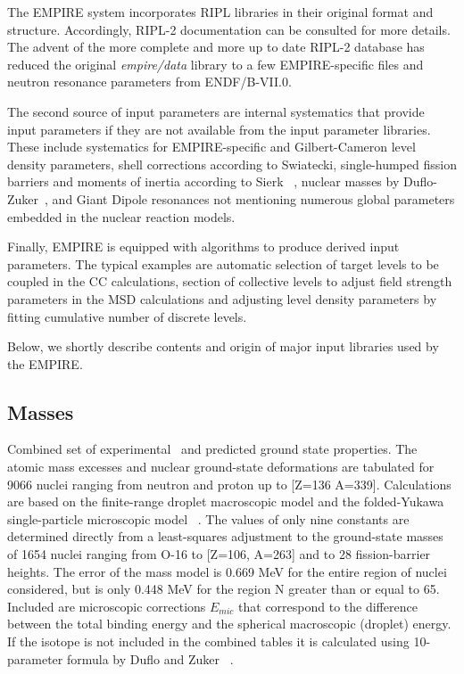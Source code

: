 The EMPIRE system incorporates RIPL libraries in their original format and
structure. Accordingly, RIPL-2 documentation can be consulted for more
details. The advent of the more complete and more up to date RIPL-2 database
has reduced the original \emph{empire/data} library to a few EMPIRE-specific
files and neutron resonance parameters from ENDF/B-VII.0.

The second source of input parameters are internal systematics that provide
input parameters if they are not available from the input parameter
libraries. These include systematics for EMPIRE-specific and Gilbert-Cameron
level density parameters, shell corrections according to Swiatecki,
single-humped fission barriers and moments of inertia according to Sierk~%
\cite{sierk}, nuclear masses by Duflo-Zuker~\cite{Duflo:96}, and Giant
Dipole resonances not mentioning numerous global parameters embedded in the
nuclear reaction models.

Finally, EMPIRE is equipped with algorithms to produce derived input
parameters. The typical examples are automatic selection of target levels to
be coupled in the CC calculations, section of collective levels to adjust
field strength parameters in the MSD calculations and adjusting level
density parameters by fitting cumulative number of discrete levels.

Below, we shortly describe contents and origin of major input libraries used
by the EMPIRE.

\subsection{Masses}

Combined set of experimental~\cite{Audi} and predicted ground state
properties. The atomic mass excesses and nuclear ground-state deformations
are tabulated for 9066 nuclei ranging from neutron and proton up to {[}Z=136
A=339{]}. Calculations are based on the finite-range droplet macroscopic
model and the folded-Yukawa single-particle microscopic model~\cite{Moller95}%
. The values of only nine constants are determined directly from a
least-squares adjustment to the ground-state masses of 1654 nuclei ranging
from O-16 to {[}Z=106, A=263{]} and to 28 fission-barrier heights. The error
of the mass model is 0.669 MeV for the entire region of nuclei considered,
but is only 0.448 MeV for the region N greater than or equal to 65. Included
are microscopic corrections $E_{mic}$ that correspond to the difference
between the total binding energy and the spherical macroscopic (droplet)
energy. If the isotope is not included in the combined tables it is
calculated using 10-parameter formula by Duflo and Zuker ~\cite{Duflo:96}.

